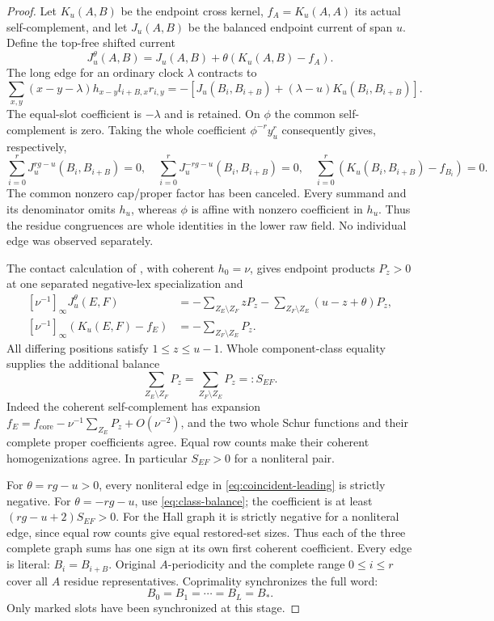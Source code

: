 \documentclass[11pt,a4paper]{amsart}
\numberwithin{equation}{section}
\theoremstyle{plain}
\theoremstyle{definition}
\begin{document}
\begin{proof}
Let \(K_u(A,B)\) be the endpoint cross kernel, \(f_A=K_u(A,A)\) its actual
self-complement, and let \(J_u(A,B)\) be the balanced endpoint current of
span \(u\).  Define the top-free shifted current
\[
 J_u^\theta(A,B)=J_u(A,B)+\theta(K_u(A,B)-f_A).
\]
The long edge for an ordinary clock \(\lambda\) contracts to
\[
 \sum_{x,y}(x-y-\lambda)h_{x-y}l_{i+B,x}r_{i,y}
     =-[J_u(B_i,B_{i+B})+(\lambda-u)K_u(B_i,B_{i+B})].
\]
The equal-slot coefficient is \(-\lambda\) and is retained.  On \(\phi\) the
common self-complement is zero.  Taking the whole coefficient
\(\phi^{-r}y_u^r\) consequently gives, respectively,
\[
 \sum_{i=0}^rJ_u^{rg-u}(B_i,B_{i+B})=0,\quad
 \sum_{i=0}^rJ_u^{-rg-u}(B_i,B_{i+B})=0,\quad
 \sum_{i=0}^r(K_u(B_i,B_{i+B})-f_{B_i})=0.
\]
The common nonzero cap/proper factor has been canceled.  Every summand and
its denominator omits \(h_u\), whereas \(\phi\) is affine with nonzero
coefficient in \(h_u\).  Thus the residue congruences are whole identities
in the lower raw field.  No individual edge was observed separately.

The contact calculation of , with coherent
\(h_0=\nu\), gives endpoint products \(P_z>0\) at one separated negative-lex
specialization and
\begin{equation}\label{eq:coincident-leading}
 \begin{aligned}
 [\nu^{-1}]_\infty J_u^\theta(E,F)
 &=-\sum_{Z_E\setminus Z_F}zP_z
   -\sum_{Z_F\setminus Z_E}(u-z+\theta)P_z,\\
 [\nu^{-1}]_\infty(K_u(E,F)-f_E)&=-\sum_{Z_F\setminus Z_E}P_z.
 \end{aligned}
\end{equation}
All differing positions satisfy \(1\le z\le u-1\).  Whole component-class
equality supplies the additional balance
\begin{equation}\label{eq:class-balance}
 \sum_{Z_E\setminus Z_F}P_z
       =\sum_{Z_F\setminus Z_E}P_z=:S_{EF}.
\end{equation}
Indeed the coherent self-complement has expansion
\(f_E=f_{\mathrm{core}}-\nu^{-1}\sum_{Z_E}P_z+O(\nu^{-2})\), and the two whole
Schur functions and their complete proper coefficients agree.  Equal row
counts make their coherent homogenizations agree.  In particular
\(S_{EF}>0\) for a nonliteral pair.

For \(\theta=rg-u>0\), every nonliteral edge in
\eqref{eq:coincident-leading} is strictly negative.  For
\(\theta=-rg-u\), use \eqref{eq:class-balance}; the coefficient is at least
\((rg-u+2)S_{EF}>0\).  For the Hall graph it is strictly negative for a
nonliteral edge, since equal row counts give equal restored-set sizes.
Thus each of the three complete graph sums has one sign at its own
first coherent coefficient.  Every edge is literal:
\(B_i=B_{i+B}\).  Original \(A\)-periodicity and the complete range \(0\le i\le r\)
cover all \(A\) residue representatives.  Coprimality synchronizes the full
word:
\begin{equation}\label{eq:literal-mark-slots}
 B_0=B_1=\cdots=B_L=B_*.
\end{equation}
Only marked slots have been synchronized at this stage.


\end{proof}
\end{document}
